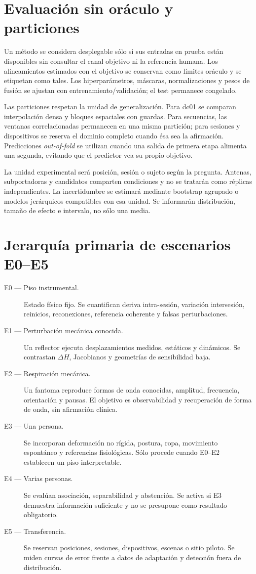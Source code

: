 \section{Evaluación sin oráculo y particiones}

Un método se considera desplegable sólo si sus entradas en prueba están disponibles sin consultar el canal objetivo ni la referencia humana. Los alineamientos estimados con el objetivo se conservan como límites oráculo y se etiquetan como tales. Los hiperparámetros, máscaras, normalizaciones y pesos de fusión se ajustan con entrenamiento/validación; el test permanece congelado.

Las particiones respetan la unidad de generalización. Para dc01 se comparan interpolación densa y bloques espaciales con guardas. Para secuencias, las ventanas correlacionadas permanecen en una misma partición; para sesiones y dispositivos se reserva el dominio completo cuando ésa sea la afirmación. Predicciones \emph{out-of-fold} se utilizan cuando una salida de primera etapa alimenta una segunda, evitando que el predictor vea su propio objetivo.

La unidad experimental será posición, sesión o sujeto según la pregunta. Antenas, subportadoras y candidatos comparten condiciones y no se tratarán como réplicas independientes. La incertidumbre se estimará mediante bootstrap agrupado o modelos jerárquicos compatibles con esa unidad. Se informarán distribución, tamaño de efecto e intervalo, no sólo una media.

\section{Jerarquía primaria de escenarios E0--E5}
\label{sec:e0e5_hierarchy}

\begin{description}
\item[E0 --- Piso instrumental.] Estado físico fijo. Se cuantifican deriva intra-sesión, variación intersesión, reinicios, reconexiones, referencia coherente y falsas perturbaciones.
\item[E1 --- Perturbación mecánica conocida.] Un reflector ejecuta desplazamientos medidos, estáticos y dinámicos. Se contrastan $\Delta H$, Jacobianos y geometrías de sensibilidad baja.
\item[E2 --- Respiración mecánica.] Un fantoma reproduce formas de onda conocidas, amplitud, frecuencia, orientación y pausas. El objetivo es observabilidad y recuperación de forma de onda, sin afirmación clínica.
\item[E3 --- Una persona.] Se incorporan deformación no rígida, postura, ropa, movimiento espontáneo y referencias fisiológicas. Sólo procede cuando E0--E2 establecen un piso interpretable.
\item[E4 --- Varias personas.] Se evalúan asociación, separabilidad y abstención. Se activa si E3 demuestra información suficiente y no se presupone como resultado obligatorio.
\item[E5 --- Transferencia.] Se reservan posiciones, sesiones, dispositivos, escenas o sitio piloto. Se miden curvas de error frente a datos de adaptación y detección fuera de distribución.
\end{description}

